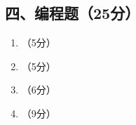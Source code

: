\documentclass[8pt]{article}
\begin{document}
\begin{CJK}{UTF8}{gkai}
\subsection*{四、编程题（25分）}

\begin{enumerate}
\item （5分）


\item （5分）


\item （6分）



\item （9分）


\end{enumerate}


\end{CJK}
\end{document}
